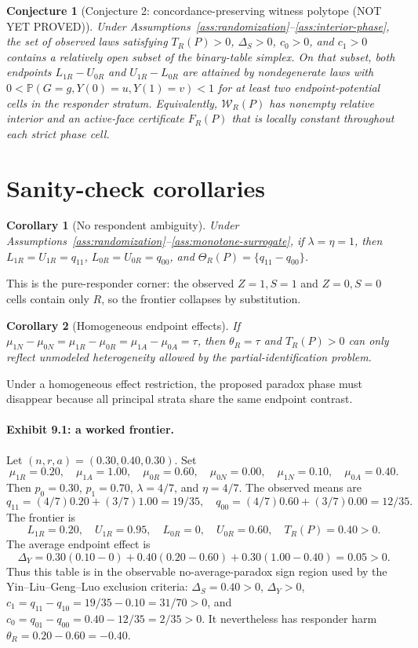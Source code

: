 \documentclass[11pt]{article}
\renewcommand{\Pr}{\mathbb{P}}
\theoremstyle{definition}
\theoremstyle{plain}
\newtheorem{conjecture}{Conjecture}
\newtheorem{corollary}{Corollary}
\theoremstyle{remark}
\begin{document}
\begin{conjecture}[Conjecture 2: concordance-preserving witness polytope (NOT YET PROVED)]\label{conj:open-witness}
Under Assumptions~\ref{ass:randomization}--\ref{ass:interior-phase}, the set of observed laws satisfying \(T_R(P)>0\), \(\Delta_S>0\), \(c_0>0\), and \(c_1>0\) contains a relatively open subset of the binary-table simplex. On that subset, both endpoints \(L_{1R}-U_{0R}\) and \(U_{1R}-L_{0R}\) are attained by nondegenerate laws with \(0<\Pr(G=g,Y(0)=u,Y(1)=v)<1\) for at least two endpoint-potential cells in the responder stratum.
Equivalently, \(\mathcal W_R(P)\) has nonempty relative interior and an active-face certificate \(F_R(P)\) that is locally constant throughout each strict phase cell.
\end{conjecture}

\section{Sanity-check corollaries}
\begin{corollary}[No respondent ambiguity]\label{cor:no-ambiguity}
Under Assumptions~\ref{ass:randomization}--\ref{ass:monotone-surrogate}, if \(\lambda=\eta=1\), then \(L_{1R}=U_{1R}=q_{11}\), \(L_{0R}=U_{0R}=q_{00}\), and \(\Theta_R(P)=\{q_{11}-q_{00}\}\).
\end{corollary}
This is the pure-responder corner: the observed \(Z=1,S=1\) and \(Z=0,S=0\) cells contain only \(R\), so the frontier collapses by substitution.

\begin{corollary}[Homogeneous endpoint effects]\label{cor:homogeneous}
If \(\mu_{1N}-\mu_{0N}=\mu_{1R}-\mu_{0R}=\mu_{1A}-\mu_{0A}=\tau\), then \(\theta_R=\tau\) and \(T_R(P)>0\) can only reflect unmodeled heterogeneity allowed by the partial-identification problem.
\end{corollary}
Under a homogeneous effect restriction, the proposed paradox phase must disappear because all principal strata share the same endpoint contrast.

\paragraph{Exhibit 9.1: a worked frontier.}
Let \((n,r,a)=(0.30,0.40,0.30)\). Set
\[
  \mu_{1R}=0.20,\quad \mu_{1A}=1.00,\quad \mu_{0R}=0.60,\quad \mu_{0N}=0.00,\quad
  \mu_{1N}=0.10,\quad \mu_{0A}=0.40 .
\]
Then \(p_0=0.30\), \(p_1=0.70\), \(\lambda=4/7\), and \(\eta=4/7\). The observed means are
\[
  q_{11}=(4/7)0.20+(3/7)1.00=19/35,\quad
  q_{00}=(4/7)0.60+(3/7)0.00=12/35.
\]
The frontier is
\[
  L_{1R}=0.20,\quad U_{1R}=0.95,\quad
  L_{0R}=0,\quad U_{0R}=0.60,\quad
  T_R(P)=0.40>0.
\]
The average endpoint effect is
\[
  \Delta_Y=0.30(0.10-0)+0.40(0.20-0.60)+0.30(1.00-0.40)=0.05>0.
\]
Thus this table is in the observable no-average-paradox sign region used by the Yin--Liu--Geng--Luo exclusion criteria: \(\Delta_S=0.40>0\), \(\Delta_Y>0\), \(c_1=q_{11}-q_{10}=19/35-0.10=31/70>0\), and \(c_0=q_{01}-q_{00}=0.40-12/35=2/35>0\). It nevertheless has responder harm \(\theta_R=0.20-0.60=-0.40\).
\end{document}
